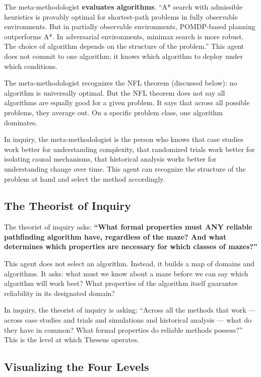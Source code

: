 \documentclass[11pt,letterpaper]{article}
\begin{document}
The meta-methodologist \textbf{evaluates algorithms}. ``A* search with admissible heuristics is provably optimal for shortest-path problems in fully observable environments. But in partially observable environments, POMDP-based planning outperforms A*. In adversarial environments, minimax search is more robust. The choice of algorithm depends on the structure of the problem.'' This agent does not commit to one algorithm; it knows which algorithm to deploy under which conditions.

The meta-methodologist recognizes the NFL theorem (discussed below): no algorithm is universally optimal. But the NFL theorem does not say all algorithms are equally good for a given problem. It says that across all possible problems, they average out. On a specific problem class, one algorithm dominates.

In inquiry, the meta-methodologist is the person who knows that case studies work better for understanding complexity, that randomized trials work better for isolating causal mechanisms, that historical analysis works better for understanding change over time. This agent can recognize the structure of the problem at hand and select the method accordingly.

\subsection*{The Theorist of Inquiry}

The theorist of inquiry asks: \textbf{``What formal properties must ANY reliable pathfinding algorithm have, regardless of the maze? And what determines which properties are necessary for which classes of mazes?''}

This agent does not select an algorithm. Instead, it builds a map of domains and algorithms. It asks: what must we know about a maze before we can say which algorithm will work best? What properties of the algorithm itself guarantee reliability in its designated domain?

In inquiry, the theorist of inquiry is asking: ``Across all the methods that work — across case studies and trials and simulations and historical analysis — what do they have in common? What formal properties do reliable methods possess?'' This is the level at which Theseus operates.

\subsection*{Visualizing the Four Levels}
\end{document}
